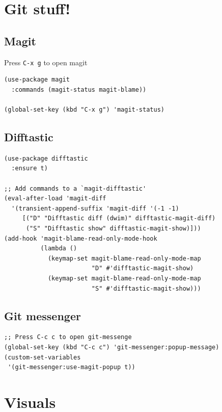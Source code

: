 \documentclass[10pt]{article}
\begin{document}
\section{Git stuff!}
\label{sec:org77e8570}
\subsection{Magit}
\label{sec:org89595ef}

Press \texttt{C-x g} to open magit

\begin{verbatim}
(use-package magit
  :commands (magit-status magit-blame))

(global-set-key (kbd "C-x g") 'magit-status)
\end{verbatim}
\subsection{Difftastic}
\label{sec:orgc75b72b}
\begin{verbatim}
(use-package difftastic
  :ensure t)

;; Add commands to a `magit-difftastic'
(eval-after-load 'magit-diff
  '(transient-append-suffix 'magit-diff '(-1 -1)
     [("D" "Difftastic diff (dwim)" difftastic-magit-diff)
      ("S" "Difftastic show" difftastic-magit-show)]))
(add-hook 'magit-blame-read-only-mode-hook
          (lambda ()
            (keymap-set magit-blame-read-only-mode-map
                        "D" #'difftastic-magit-show)
            (keymap-set magit-blame-read-only-mode-map
                        "S" #'difftastic-magit-show)))
\end{verbatim}
\subsection{Git messenger}
\label{sec:orgbcdfb8f}
\begin{verbatim}
;; Press C-c c to open git-messenge
(global-set-key (kbd "C-c c") 'git-messenger:popup-message)
(custom-set-variables
 '(git-messenger:use-magit-popup t))
\end{verbatim}
\section{Visuals}
\label{sec:org65ccab4}
\end{document}
